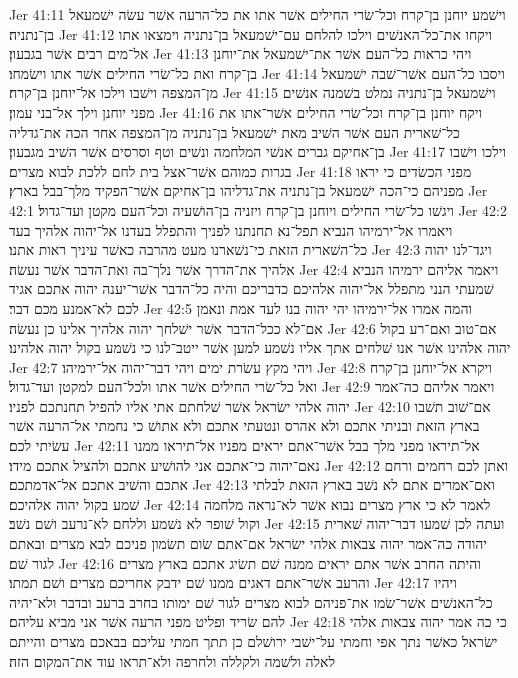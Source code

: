 Jer 41:11  וישׁמע יוחנן בן־קרח וכל־שׂרי החילים אשׁר אתו את כל־הרעה אשׁר עשׂה ישׁמעאל בן־נתניה׃
Jer 41:12  ויקחו את־כל־האנשׁים וילכו להלחם עם־ישׁמעאל בן־נתניה וימצאו אתו אל־מים רבים אשׁר בגבעון׃
Jer 41:13  ויהי כראות כל־העם אשׁר את־ישׁמעאל את־יוחנן בן־קרח ואת כל־שׂרי החילים אשׁר אתו וישׂמחו׃
Jer 41:14  ויסבו כל־העם אשׁר־שׁבה ישׁמעאל מן־המצפה וישׁבו וילכו אל־יוחנן בן־קרח׃
Jer 41:15  וישׁמעאל בן־נתניה נמלט בשׁמנה אנשׁים מפני יוחנן וילך אל־בני עמון׃
Jer 41:16  ויקח יוחנן בן־קרח וכל־שׂרי החילים אשׁר־אתו את כל־שׁארית העם אשׁר השׁיב מאת ישׁמעאל בן־נתניה מן־המצפה אחר הכה את־גדליה בן־אחיקם גברים אנשׁי המלחמה ונשׁים וטף וסרסים אשׁר השׁיב מגבעון׃
Jer 41:17  וילכו וישׁבו בגרות כמוהם אשׁר־אצל בית לחם ללכת לבוא מצרים׃
Jer 41:18  מפני הכשׂדים כי יראו מפניהם כי־הכה ישׁמעאל בן־נתניה את־גדליהו בן־אחיקם אשׁר־הפקיד מלך־בבל בארץ׃
Jer 42:1  ויגשׁו כל־שׂרי החילים ויוחנן בן־קרח ויזניה בן־הושׁעיה וכל־העם מקטן ועד־גדול׃
Jer 42:2  ויאמרו אל־ירמיהו הנביא תפל־נא תחנתנו לפניך והתפלל בעדנו אל־יהוה אלהיך בעד כל־השׁארית הזאת כי־נשׁארנו מעט מהרבה כאשׁר עיניך ראות אתנו׃
Jer 42:3  ויגד־לנו יהוה אלהיך את־הדרך אשׁר נלך־בה ואת־הדבר אשׁר נעשׂה׃
Jer 42:4  ויאמר אליהם ירמיהו הנביא שׁמעתי הנני מתפלל אל־יהוה אלהיכם כדבריכם והיה כל־הדבר אשׁר־יענה יהוה אתכם אגיד לכם לא־אמנע מכם דבר׃
Jer 42:5  והמה אמרו אל־ירמיהו יהי יהוה בנו לעד אמת ונאמן אם־לא ככל־הדבר אשׁר ישׁלחך יהוה אלהיך אלינו כן נעשׂה׃
Jer 42:6  אם־טוב ואם־רע בקול יהוה אלהינו אשׁר אנו שׁלחים אתך אליו נשׁמע למען אשׁר ייטב־לנו כי נשׁמע בקול יהוה אלהינו׃
Jer 42:7  ויהי מקץ עשׂרת ימים ויהי דבר־יהוה אל־ירמיהו׃
Jer 42:8  ויקרא אל־יוחנן בן־קרח ואל כל־שׂרי החילים אשׁר אתו ולכל־העם למקטן ועד־גדול׃
Jer 42:9  ויאמר אליהם כה־אמר יהוה אלהי ישׂראל אשׁר שׁלחתם אתי אליו להפיל תחנתכם לפניו׃
Jer 42:10  אם־שׁוב תשׁבו בארץ הזאת ובניתי אתכם ולא אהרס ונטעתי אתכם ולא אתושׁ כי נחמתי אל־הרעה אשׁר עשׂיתי לכם׃
Jer 42:11  אל־תיראו מפני מלך בבל אשׁר־אתם יראים מפניו אל־תיראו ממנו נאם־יהוה כי־אתכם אני להושׁיע אתכם ולהציל אתכם מידו׃
Jer 42:12  ואתן לכם רחמים ורחם אתכם והשׁיב אתכם אל־אדמתכם׃
Jer 42:13  ואם־אמרים אתם לא נשׁב בארץ הזאת לבלתי שׁמע בקול יהוה אלהיכם׃
Jer 42:14  לאמר לא כי ארץ מצרים נבוא אשׁר לא־נראה מלחמה וקול שׁופר לא נשׁמע וללחם לא־נרעב ושׁם נשׁב׃
Jer 42:15  ועתה לכן שׁמעו דבר־יהוה שׁארית יהודה כה־אמר יהוה צבאות אלהי ישׂראל אם־אתם שׂום תשׂמון פניכם לבא מצרים ובאתם לגור שׁם׃
Jer 42:16  והיתה החרב אשׁר אתם יראים ממנה שׁם תשׂיג אתכם בארץ מצרים והרעב אשׁר־אתם דאגים ממנו שׁם ידבק אחריכם מצרים ושׁם תמתו׃
Jer 42:17  ויהיו כל־האנשׁים אשׁר־שׂמו את־פניהם לבוא מצרים לגור שׁם ימותו בחרב ברעב ובדבר ולא־יהיה להם שׂריד ופליט מפני הרעה אשׁר אני מביא עליהם׃
Jer 42:18  כי כה אמר יהוה צבאות אלהי ישׂראל כאשׁר נתך אפי וחמתי על־ישׁבי ירושׁלם כן תתך חמתי עליכם בבאכם מצרים והייתם לאלה ולשׁמה ולקללה ולחרפה ולא־תראו עוד את־המקום הזה׃
